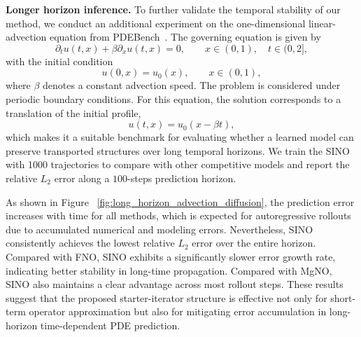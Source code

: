 \documentclass[preprint,numbers,sort&compress]{elsarticle}
\begin{document}
			{\textbf{Longer horizon inference.}
				To further validate the temporal stability of our method, we conduct an additional experiment on the
				one-dimensional linear-advection equation from PDEBench~\cite{PDEbench}. The governing equation is
				given by
				\begin{equation}
					\partial_t u(t,x) + \beta \partial_x u(t,x) = 0,
					\qquad x\in(0,1),\quad t\in(0,2],
					\label{eq:advection}
				\end{equation}
				with the initial condition
				\begin{equation}
					u(0,x)=u_0(x), \qquad x\in(0,1),
				\end{equation}
				where $\beta$ denotes a constant advection speed. The problem is considered
				under periodic boundary conditions. For this equation, the solution corresponds
				to a translation of the initial profile,
				\[
				u(t,x)=u_0(x-\beta t),
				\]
				which makes it a suitable benchmark for evaluating whether a learned model can
				preserve transported structures over long temporal horizons.
				We train the SINO with 1000 trajectories to compare with other competitive models and report the relative $L_2$ error along a $100$-steps prediction horizon.
				
				As shown in Figure ~\ref{fig:long_horizon_advection_diffusion}, the prediction error
				increases with time for all methods, which is expected for autoregressive
				rollouts due to accumulated numerical and modeling errors. Nevertheless, SINO
				consistently achieves the lowest relative $L_2$ error over the entire horizon.
				Compared with FNO, SINO exhibits a significantly slower error growth rate,
				indicating better stability in long-time propagation. Compared with MgNO, SINO
				also maintains a clear advantage across most rollout steps. These results
				suggest that the proposed starter-iterator structure is effective not only for
				short-term operator approximation but also for mitigating error accumulation in
				long-horizon time-dependent PDE prediction.}
			
\end{document}
